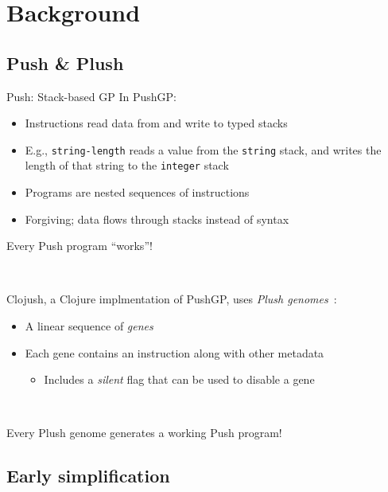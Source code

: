 \documentclass{beamer}
\begin{document}
\section{Background}

\subsection{Push \& Plush}

\begin{frame}{Push: Stack-based GP}
In PushGP:
\begin{itemize}
	\item Instructions read data from and write to typed stacks
	\item E.g., \texttt{string-length} reads a value from the \texttt{string} stack, and writes the length of that string to the \texttt{integer} stack
	\item Programs are nested sequences of instructions
	\item Forgiving; data flows through stacks instead of syntax
\end{itemize}
Every Push program ``works''!

~

Clojush, a Clojure implmentation of PushGP, uses \emph{Plush genomes}~\cite{Helmuth:2016:GPTP}:
\begin{itemize}
	\item A linear sequence of \emph{genes}
	\item Each gene contains an instruction along with other metadata
	\begin{itemize}
		\item Includes a \emph{silent} flag that can be used to disable a gene
	\end{itemize}
\end{itemize}

~

Every Plush genome generates a working Push program!

\end{frame}

\subsection{Early simplification}
\end{document}
